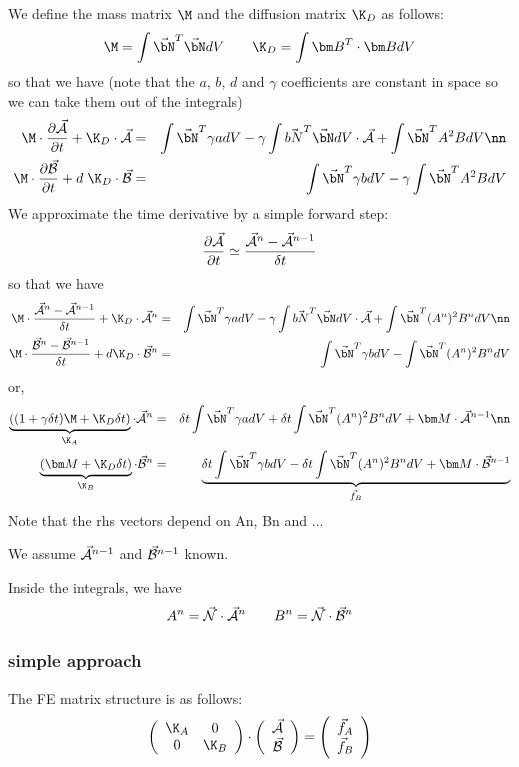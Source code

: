 We define the mass matrix $\M$ and the diffusion matrix $\K_D$ as follows:
\[
{\M} = 
\int \vec{\bN}^T \vec{\bN} dV 
\qquad
\K_D = 
\int {\bm B}^T \cdot {\bm B} dV  
\]
so that we have (note that  the $a$, $b$, $d$ and $\gamma$ coefficients are
constant in space so we can take them out of the integrals)
\begin{eqnarray}
{\M} \cdot  \frac{\partial \vec{\cal A}}{\partial t} + 
\K_D \cdot \vec{\cal A} 
&=& \int \vec{\bN}^T \gamma a dV 
- \gamma \int \vec{bN}^T \vec{\bN} dV \cdot \vec{\cal A}
+ \int \vec{\bN}^T A^2 B dV  \nn\\
{\M} \cdot  \frac{\partial \vec{\cal B}}{\partial t} + 
d\; \K_D \cdot \vec{\cal B} 
&=& \int \vec{\bN}^T \gamma b dV 
- \gamma \int \vec{\bN}^T A^2 B dV 
\end{eqnarray}
We approximate the time derivative by a simple forward step:
\[
\frac{\partial \vec{\cal A}}{\partial t}  \simeq
\frac{ \vec{\cal A}^n - \vec{\cal A}^{n-1}  }{\delta t} 
\]
so that we have
\begin{eqnarray}
{\M} \cdot \frac{ \vec{\cal A}^n - \vec{\cal A}^{n-1}  }{\delta t}  +
\K_D \cdot \vec{\cal A}^n 
&=& \int \vec{\bN}^T \gamma a dV 
- \gamma \int \vec{bN}^T \vec{\bN} dV \cdot \vec{\cal A}
+ \int \vec{\bN}^T (A^n)^2 B^n dV  \nn\\
{\M} \cdot \frac{ \vec{\cal B}^n - \vec{\cal B}^{n-1}  }{\delta t}  +
d \K_D \cdot \vec{\cal B}^n 
&=& \int \vec{\bN}^T \gamma b dV 
- \int \vec{\bN}^T (A^n)^2 B^n dV 
\end{eqnarray}
or,
\begin{eqnarray}
\underbrace{
((1+\gamma \delta t) {\M} + \K_D  \delta t )}_{\K_A} \cdot \vec{\cal A}^n 
&=& \delta t \int \vec{\bN}^T \gamma a dV 
+ \delta t\int \vec{\bN}^T (A^n)^2 B^n dV  
+ {\bm M} \cdot \vec{\cal A}^{n-1}
\nn\\
\underbrace{({\bm M} + \K_D \delta t)}_{\K_B} \cdot \vec{\cal B}^n 
&=& 
\underbrace{
\delta t \int \vec{\bN}^T \gamma b dV 
- \delta t\int \vec{\bN}^T (A^n)^2 B^n dV 
+ {\bm M} \cdot \vec{\cal B}^{n-1}}_{\vec{f}_B}
\end{eqnarray}
Note that the rhs vectors depend on An, Bn and ...

We assume $\vec{\cal A}^{n-1}$ and $\vec{\cal B}^{n-1}$ known. 


Inside the integrals, we have
\[
A^n = \vec{\cal N}\cdot \vec{\cal A}^n
\qquad 
B^n = \vec{\cal N}\cdot \vec{\cal B}^n
\]



\subsubsection*{simple approach} The FE matrix structure is as follows:
\[
\left(
\begin{array}{cc}
\K_A & 0 \\
0 & \K_B
\end{array}
\right)
\cdot
\left(
\begin{array}{c}
\vec{\cal A}\\
\vec{\cal B}
\end{array}
\right)
=
\left(
\begin{array}{c}
\vec{f}_A\\
\vec{f}_B
\end{array}
\right)
\]


